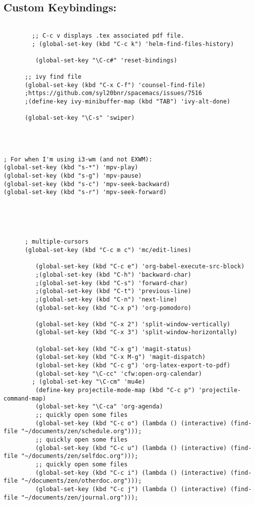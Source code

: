 \documentclass[11pt]{article}
\begin{document}
\subsection{Custom Keybindings:}
\label{sec:org7fc1b3b}

\begin{verbatim}

        ;; C-c v displays .tex associated pdf file.
        ; (global-set-key (kbd "C-c k") 'helm-find-files-history)

         (global-set-key "\C-c#" 'reset-bindings)

      ;; ivy find file
      (global-set-key (kbd "C-x C-f") 'counsel-find-file)
      ;https://github.com/syl20bnr/spacemacs/issues/7516
      ;(define-key ivy-minibuffer-map (kbd "TAB") 'ivy-alt-done)

      (global-set-key "\C-s" 'swiper)




; For when I'm using i3-wm (and not EXWM):
(global-set-key (kbd "s-*") 'mpv-play)
(global-set-key (kbd "s-g") 'mpv-pause)
(global-set-key (kbd "s-c") 'mpv-seek-backward)
(global-set-key (kbd "s-r") 'mpv-seek-forward)





      ; multiple-cursors
      (global-set-key (kbd "C-c m c") 'mc/edit-lines)

         (global-set-key (kbd "C-c e") 'org-babel-execute-src-block)
         ;(global-set-key (kbd "C-h") 'backward-char)
         ;(global-set-key (kbd "C-s") 'forward-char)
         ;(global-set-key (kbd "C-t") 'previous-line)
         ;(global-set-key (kbd "C-n") 'next-line)
         (global-set-key (kbd "C-x p") 'org-pomodoro)

         (global-set-key (kbd "C-x 2") 'split-window-vertically)
         (global-set-key (kbd "C-x 3") 'split-window-horizontally)

         (global-set-key (kbd "C-x g") 'magit-status)
         (global-set-key (kbd "C-x M-g") 'magit-dispatch)
         (global-set-key (kbd "C-c g") 'org-latex-export-to-pdf)
         (global-set-key "\C-cc" 'cfw:open-org-calendar)
        ; (global-set-key "\C-cm" 'mu4e)
         (define-key projectile-mode-map (kbd "C-c p") 'projectile-command-map)
         (global-set-key "\C-ca" 'org-agenda)
         ;; quickly open some files
         (global-set-key (kbd "C-c o") (lambda () (interactive) (find-file "~/documents/zen/schedule.org")));
         ;; quickly open some files
         (global-set-key (kbd "C-c u") (lambda () (interactive) (find-file "~/documents/zen/selfdoc.org")));
         ;; quickly open some files
         (global-set-key (kbd "C-c i") (lambda () (interactive) (find-file "~/documents/zen/otherdoc.org")));
         (global-set-key (kbd "C-c j") (lambda () (interactive) (find-file "~/documents/zen/journal.org")));



\end{verbatim}
\end{document}
